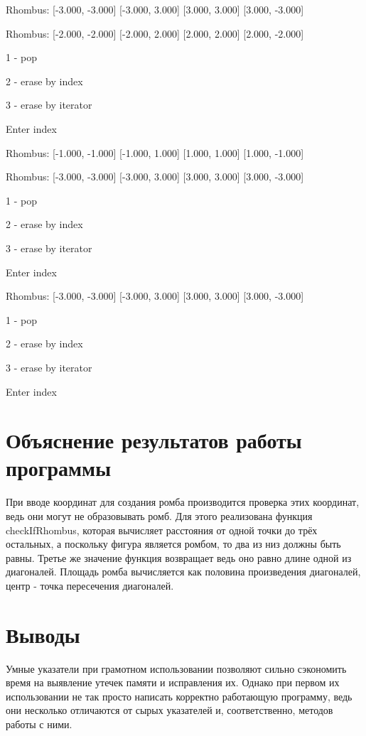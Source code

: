 \documentclass[a4paper, 12pt]{article}
\begin{document}
Rhombus: [-3.000, -3.000] [-3.000, 3.000] [3.000, 3.000] [3.000, -3.000] 

Rhombus: [-2.000, -2.000] [-2.000, 2.000] [2.000, 2.000] [2.000, -2.000] 

1 - pop

2 - erase by index

3 - erase by iterator

Enter index

Rhombus: [-1.000, -1.000] [-1.000, 1.000] [1.000, 1.000] [1.000, -1.000] 

Rhombus: [-3.000, -3.000] [-3.000, 3.000] [3.000, 3.000] [3.000, -3.000] 

1 - pop

2 - erase by index

3 - erase by iterator

Enter index

Rhombus: [-3.000, -3.000] [-3.000, 3.000] [3.000, 3.000] [3.000, -3.000] 

1 - pop

2 - erase by index

3 - erase by iterator

Enter index
\newpage

\section{Объяснение результатов работы программы}

При вводе координат для создания ромба производится проверка этих координат, ведь они могут не образовывать ромб. Для этого реализована функция checkIfRhombus, которая вычисляет расстояния от одной точки до трёх остальных, а поскольку фигура является ромбом, то два из низ должны быть равны. Третье же значение функция возвращает ведь оно равно длине одной из диагоналей. Площадь ромба вычисляется как половина произведения диагоналей, центр - точка пересечения диагоналей.   

\newpage
\section{Выводы}

Умные указатели при грамотном использовании позволяют сильно сэкономить время на выявление утечек памяти и исправления их. Однако при первом их использовании не так просто написать корректно работающую программу, ведь они несколько отличаются от сырых указателей и, соответственно, методов работы с ними.
\end{document}
